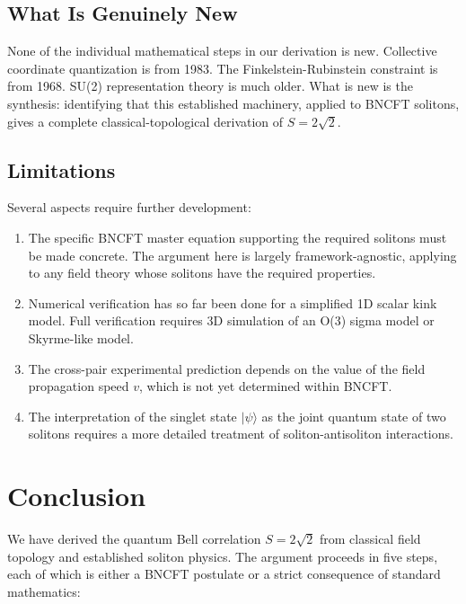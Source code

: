 ﻿\documentclass[11pt,a4paper]{article}
\begin{document}
\subsection{What Is Genuinely New}

None of the individual mathematical steps in our derivation is new. Collective coordinate quantization is from 1983. The Finkelstein-Rubinstein constraint is from 1968. SU(2) representation theory is much older. What is new is the synthesis: identifying that this established machinery, applied to BNCFT solitons, gives a complete classical-topological derivation of $S = 2\sqrt{2}$.

\subsection{Limitations}

Several aspects require further development:
\begin{enumerate}
\item The specific BNCFT master equation supporting the required solitons must be made concrete. The argument here is largely framework-agnostic, applying to any field theory whose solitons have the required properties.
\item Numerical verification has so far been done for a simplified 1D scalar kink model. Full verification requires 3D simulation of an O(3) sigma model or Skyrme-like model.
\item The cross-pair experimental prediction depends on the value of the field propagation speed $v$, which is not yet determined within BNCFT.
\item The interpretation of the singlet state $|\psi\rangle$ as the joint quantum state of two solitons requires a more detailed treatment of soliton-antisoliton interactions.
\end{enumerate}

\section{Conclusion}

We have derived the quantum Bell correlation $S = 2\sqrt{2}$ from classical field topology and established soliton physics. The argument proceeds in five steps, each of which is either a BNCFT postulate or a strict consequence of standard mathematics:
\end{document}
